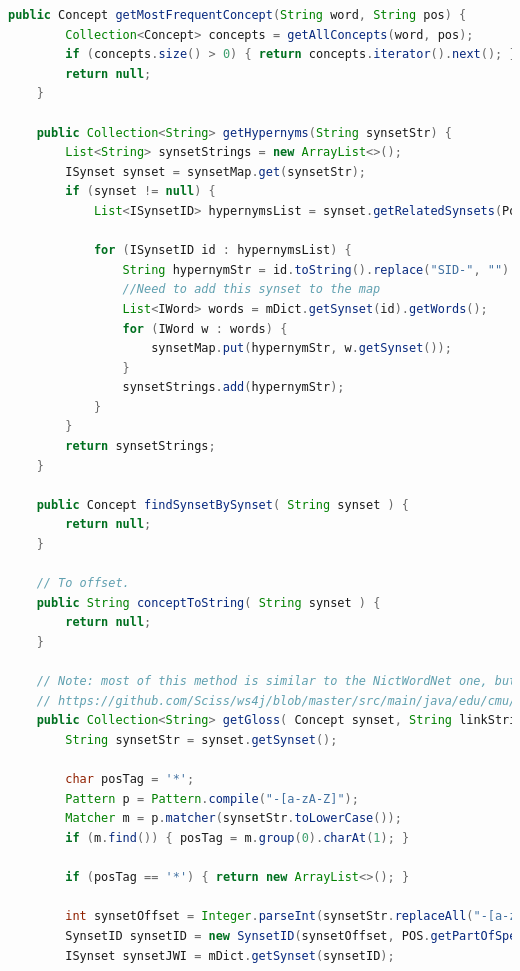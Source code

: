 \documentclass[12pt]{article}
\begin{document}
\begin{lstlisting}[language=Java]
    public Concept getMostFrequentConcept(String word, String pos) {
        Collection<Concept> concepts = getAllConcepts(word, pos);
        if (concepts.size() > 0) { return concepts.iterator().next(); }
        return null;
    }

    public Collection<String> getHypernyms(String synsetStr) {
        List<String> synsetStrings = new ArrayList<>();
        ISynset synset = synsetMap.get(synsetStr);
        if (synset != null) {
            List<ISynsetID> hypernymsList = synset.getRelatedSynsets(Pointer.HYPERNYM);

            for (ISynsetID id : hypernymsList) {
                String hypernymStr = id.toString().replace("SID-", "").toLowerCase();
                //Need to add this synset to the map
                List<IWord> words = mDict.getSynset(id).getWords();
                for (IWord w : words) {
                    synsetMap.put(hypernymStr, w.getSynset());
                }
                synsetStrings.add(hypernymStr);
            }
        }
        return synsetStrings;
    }

    public Concept findSynsetBySynset( String synset ) {
        return null;
    }

    // To offset.
    public String conceptToString( String synset ) {
        return null;
    }

    // Note: most of this method is similar to the NictWordNet one, but using JWI instead
    // https://github.com/Sciss/ws4j/blob/master/src/main/java/edu/cmu/lti/lexical_db/NictWordNet.java
    public Collection<String> getGloss( Concept synset, String linkString ) {
        String synsetStr = synset.getSynset();

        char posTag = '*';
        Pattern p = Pattern.compile("-[a-zA-Z]");
        Matcher m = p.matcher(synsetStr.toLowerCase());
        if (m.find()) { posTag = m.group(0).charAt(1); }

        if (posTag == '*') { return new ArrayList<>(); }

        int synsetOffset = Integer.parseInt(synsetStr.replaceAll("-[a-zA-Z]", ""));
        SynsetID synsetID = new SynsetID(synsetOffset, POS.getPartOfSpeech(posTag));
        ISynset synsetJWI = mDict.getSynset(synsetID);


\end{lstlisting}
\end{document}
